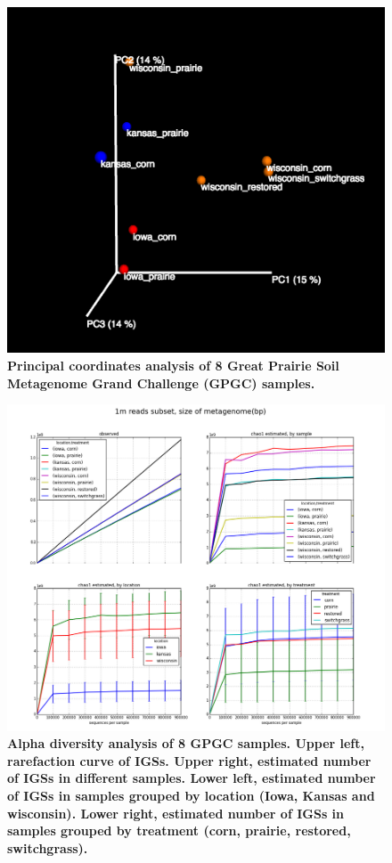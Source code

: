 \documentclass{article}
\begin{document}
\begin{figure}[!ht]
 \centerline{\includegraphics[width=6in]{./figures/GPGC_old_subset1M.png}}
\caption{\bf Principal coordinates analysis of 8 Great Prairie Soil Metagenome
Grand Challenge (GPGC) samples.}
\label{fig:GPGC_beta}
\end{figure}



\begin{figure}[!ht]
 \centerline{\includegraphics[width=6in]{./figures/GPGC_1m_old.png}}
\caption{\bf Alpha diversity analysis of 8 GPGC samples. Upper left,
rarefaction curve of IGSs. Upper right, estimated number of IGSs in different
samples. Lower left, estimated number of IGSs in samples grouped by
location (Iowa, Kansas and wisconsin). Lower right, estimated number of IGSs in
samples grouped by treatment (corn, prairie, restored, switchgrass).}
\label{fig:GPGC-alpha}
\end{figure}
\end{document}
